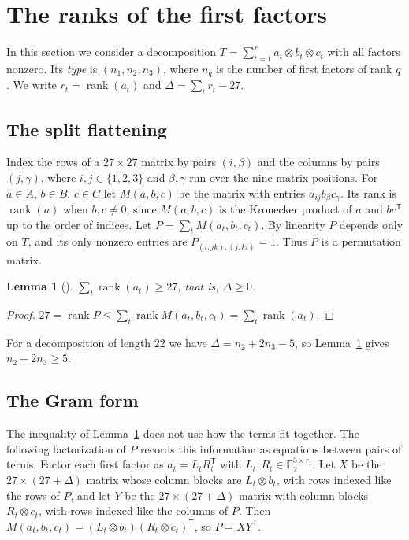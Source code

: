 \documentclass[11pt]{amsart}
\newtheorem{lemma}[theorem]{Lemma}
\theoremstyle{definition}
\theoremstyle{remark}
\numberwithin{equation}{section}
\newcommand{\F}{\mathbb{F}_2}
\newcommand{\rk}{\operatorname{rank}}
\begin{document}
\section{The ranks of the first factors}\label{sec:types}

In this section we consider a decomposition $T=\sum_{t=1}^{r}a_t\otimes b_t\otimes c_t$ with all factors nonzero. Its \emph{type} is $(n_1,n_2,n_3)$, where $n_q$ is the number of first factors of rank $q$. We write $r_t=\rk(a_t)$ and $\Delta=\sum_t r_t-27$.

\subsection{The split flattening}
Index the rows of a $27\times 27$ matrix by pairs $(i,\beta)$ and the columns by pairs $(j,\gamma)$, where $i,j\in\{1,2,3\}$ and $\beta,\gamma$ run over the nine matrix positions. For $a\in A$, $b\in B$, $c\in C$ let $M(a,b,c)$ be the matrix with entries $a_{ij}b_\beta c_\gamma$. Its rank is $\rk(a)$ when $b,c\ne 0$, since $M(a,b,c)$ is the Kronecker product of $a$ and $bc^{\mathsf T}$ up to the order of indices. Let $P=\sum_t M(a_t,b_t,c_t)$. By linearity $P$ depends only on $T$, and its only nonzero entries are $P_{(i,jk),(j,ki)}=1$. Thus $P$ is a permutation matrix.

\begin{lemma}[{\cite[(4.2)]{Yan26}}]\label{lem:split}
$\sum_t\rk(a_t)\ge 27$, that is, $\Delta\ge 0$.
\end{lemma}

\begin{proof}
$27=\rk P\le\sum_t\rk M(a_t,b_t,c_t)=\sum_t\rk(a_t)$.
\end{proof}

For a decomposition of length $22$ we have $\Delta=n_2+2n_3-5$, so Lemma~\ref{lem:split} gives $n_2+2n_3\ge 5$.

\subsection{The Gram form}
The inequality of Lemma~\ref{lem:split} does not use how the terms fit together. The following factorization of $P$ records this information as equations between pairs of terms. Factor each first factor as $a_t=L_tR_t^{\mathsf T}$ with $L_t,R_t\in\F^{3\times r_t}$. Let $X$ be the $27\times(27+\Delta)$ matrix whose column blocks are $L_t\otimes b_t$, with rows indexed like the rows of $P$, and let $Y$ be the $27\times(27+\Delta)$ matrix with column blocks $R_t\otimes c_t$, with rows indexed like the columns of $P$. Then $M(a_t,b_t,c_t)=(L_t\otimes b_t)(R_t\otimes c_t)^{\mathsf T}$, so $P=XY^{\mathsf T}$.
\end{document}
